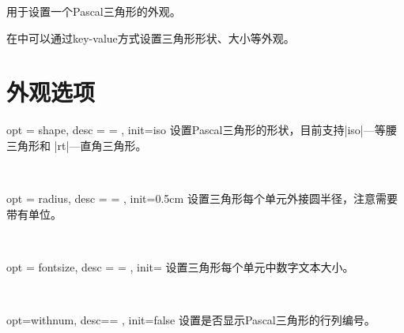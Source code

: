 \documentclass[full]{l3doc}
\begin{document}
\begin{documentation}
\begin{function}{\pascalset}
\end{function}

  用于设置一个Pascal三角形的外观。

  在中可以通过key-value方式设置三角形形状、大小等外观。

\section{外观选项}

\begin{option}{ opt = shape, desc = {= }, init=iso }
  设置Pascal三角形的形状，目前支持|iso|---等腰三角形和
  |rt|---直角三角形。
\end{option}\\
\begin{SideBySideExample}[frame=single,numbers=left,xrightmargin=.65\linewidth,gobble=2]
  \centering
  \qquad
\end{SideBySideExample}

\bigskip

\begin{option}{ opt = radius, desc = {= }, init=0.5cm }
  设置三角形每个单元外接圆半径，注意需要带有单位。
\end{option}\\
\begin{SideBySideExample}[frame=single,numbers=left,xrightmargin=.65\linewidth,gobble=2]
  \centering
\end{SideBySideExample}

\bigskip

\begin{option}{ opt = fontsize, desc = {= }, init= }
  设置三角形每个单元中数字文本大小。
\end{option}\\
\begin{SideBySideExample}[frame=single,numbers=left,xrightmargin=.65\linewidth,gobble=2]
  \centering
\end{SideBySideExample}

\bigskip

\begin{option}{opt=withnum, desc={= }, init=false}
    设置是否显示Pascal三角形的行列编号。
\end{option}\\
\begin{SideBySideExample}[frame=single,numbers=left,xrightmargin=.63\linewidth,gobble=2]
  \centering
\end{SideBySideExample}


\end{documentation}
\end{document}

